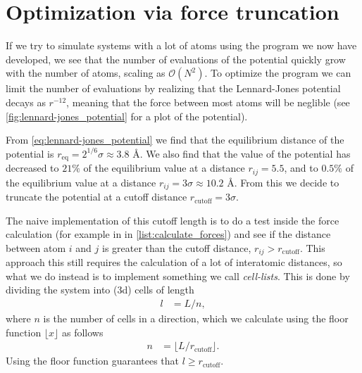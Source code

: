\section{Optimization via force truncation\label{sec:cell_lists}}
If we try to simulate systems with a lot of atoms using the program we now have developed, we see that the number of evaluations of the potential quickly grow with the number of atoms, scaling as $\mathcal{O}(N^2)$. To optimize the program we can limit the number of evaluations by realizing that the Lennard-Jones potential decays as $r^{-12}$, meaning that the force between most atoms will be neglible (see \cref{fig:lennard-jones_potential} for a plot of the potential). 

From \cref{eq:lennard-jones_potential} we find that the equilibrium distance of the potential is $r_{\text{eq}} =  2^{1/6}\sigma \approx 3.8 \text{~\AA}$. We also find that the value of the potential has decreased to $21\%$ of the equilibrium value at a distance $r_{ij} =  5.5$, and to $0.5\%$ of the equilibrium value at a distance $r_{ij} =  3\sigma \approx 10.2\text{~\AA}$. From this we decide to truncate the potential at a cutoff distance $r_\text{cutoff} = 3\sigma$.

The naive implementation of this cutoff length is to do a test inside the force calculation (for example in  in \cref{list:calculate_forces}) and see if the distance between atom $i$ and $j$ is greater than the cutoff distance, $r_{ij} > r_\text{cutoff}$. This approach this still requires the calculation of a lot of interatomic distances, so what we do instead is to implement something we call \emph{cell-lists}. This is done by dividing the system into (3d) cells of length 
\begin{align*}
    l &= L/n,
\end{align*}
where $n$ is the number of cells in a direction, which we calculate using the floor function $\lfloor x \rfloor$ as follows
\begin{align*}
    n &= \lfloor  L/r_\text{cutoff} \rfloor.
\end{align*}
Using the floor function guarantees that $l \geq r_\text{cutoff}$. 

